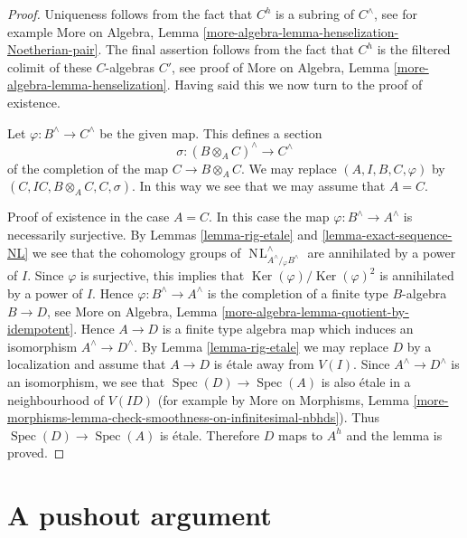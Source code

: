\documentclass{stacks-project}
\theoremstyle{plain}
\theoremstyle{definition}
\theoremstyle{remark}
\numberwithin{equation}{subsection}
\def\Spec{\mathop{\mathrm{Spec}}}
\def\NL{\mathop{N\!L}\nolimits}
\def\Ker{\mathop{\mathrm{Ker}}}
\begin{document}
\begin{proof}
Uniqueness follows from the fact that $C^h$ is a subring of
$C^\wedge$, see for example
More on Algebra, Lemma \ref{more-algebra-lemma-henselization-Noetherian-pair}.
The final assertion follows from the fact that $C^h$ is the filtered colimit
of these $C$-algebras $C'$, see proof of
More on Algebra, Lemma \ref{more-algebra-lemma-henselization}.
Having said this we now turn to the proof of existence.

\medskip\noindent
Let $\varphi : B^\wedge \to C^\wedge$ be the given map.
This defines a section
$$
\sigma : (B \otimes_A C)^\wedge \longrightarrow C^\wedge
$$
of the completion of the map $C \to B \otimes_A C$. We may
replace $(A, I, B, C, \varphi)$ by $(C, IC, B \otimes_A C, C, \sigma)$.
In this way we see that we may assume that $A = C$.

\medskip\noindent
Proof of existence in the case $A = C$. In this case the map
$\varphi : B^\wedge \to A^\wedge$ is necessarily surjective.
By Lemmas \ref{lemma-rig-etale} and \ref{lemma-exact-sequence-NL}
we see that the cohomology groups of
$\NL_{A^\wedge/\!_\varphi B^\wedge}^\wedge$
are annihilated by a power of $I$. Since $\varphi$ is surjective,
this implies that $\Ker(\varphi)/\Ker(\varphi)^2$ is annihilated
by a power of $I$. Hence $\varphi : B^\wedge \to A^\wedge$
is the completion of a finite type $B$-algebra $B \to D$, see
More on Algebra, Lemma \ref{more-algebra-lemma-quotient-by-idempotent}.
Hence $A \to D$ is a finite type algebra map which induces an isomorphism
$A^\wedge \to D^\wedge$. By
Lemma \ref{lemma-rig-etale} we may replace $D$ by a localization
and assume that $A \to D$ is \'etale away from $V(I)$.
Since $A^\wedge \to D^\wedge$ is an isomorphism, we see that
$\Spec(D) \to \Spec(A)$ is also \'etale in a neighbourhood of $V(ID)$
(for example by
More on Morphisms, Lemma
\ref{more-morphisms-lemma-check-smoothness-on-infinitesimal-nbhds}).
Thus $\Spec(D) \to \Spec(A)$ is \'etale. Therefore $D$ maps to
$A^h$ and the lemma is proved.
\end{proof}
















\section{A pushout argument}
\label{section-approximation}
\end{document}
